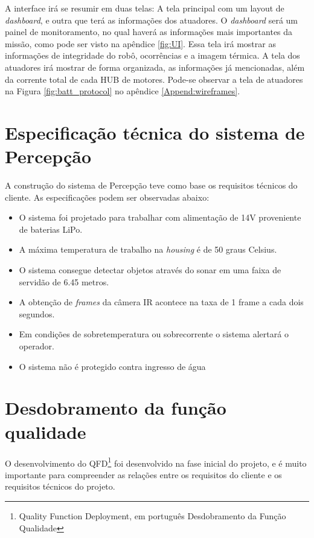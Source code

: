 A interface irá se resumir em duas telas: A tela principal com um layout de \textit{dashboard}, e outra que terá as informações dos atuadores. O \textit{dashboard} será um painel de monitoramento, no qual haverá as informações mais importantes da missão, como pode ser visto na apêndice \ref{fig:UI}. Essa tela irá mostrar as informações de integridade do robô, ocorrências e a imagem térmica. A tela dos atuadores irá mostrar de forma organizada, as informações já mencionadas, além da corrente total de cada HUB de motores. Pode-se observar a tela de atuadores na Figura \ref{fig:batt_protocol} no apêndice \ref{Append:wireframes}.


\section{Especificação técnica do sistema de Percepção}
\label{ssec:espt}

A construção do sistema de Percepção teve como base os requisitos técnicos do cliente. As especificações podem ser observadas abaixo:
\begin{itemize}
\item O sistema foi projetado para trabalhar com alimentação de 14V proveniente de baterias LiPo.
\item A máxima temperatura de trabalho na \textit{housing} é de 50 graus Celsius.
\item O sistema consegue detectar objetos através do sonar em uma faixa de servidão de 6.45 metros.
\item A obtenção de \textit{frames} da câmera IR acontece na taxa de 1 frame a cada dois segundos.
\item Em condições de sobretemperatura ou sobrecorrente o sistema alertará o operador.
\item O sistema não é protegido contra ingresso de água
\end{itemize} 


\section{Desdobramento da função qualidade}
\label{sec:qfd}

O desenvolvimento do QFD\footnote{Quality Function Deployment, em português Desdobramento da Função Qualidade} foi desenvolvido na fase inicial do projeto, e é muito importante para compreender as relações entre os requisitos do cliente e os requisitos técnicos do projeto.

